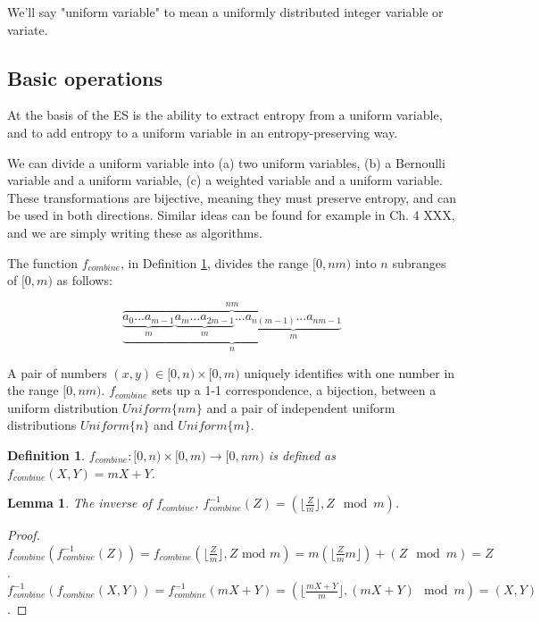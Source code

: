 \documentclass[12pt]{article}
\newtheorem{lemma}{Lemma}
\newtheorem{definition}{Definition}
\begin{document}
We'll say "uniform variable" to mean a uniformly distributed integer variable or variate.


\subsection{Basic operations}

At the basis of the ES is the ability to extract entropy from a uniform variable, and to add entropy to a uniform variable in an entropy-preserving way.

We can divide a uniform variable into (a) two uniform variables, (b) a Bernoulli variable and a uniform variable, (c) a weighted variable and a uniform variable. These transformations are bijective, meaning they must preserve entropy, and can be used in both directions. Similar ideas can be found for example in \cite{gentle2003random} Ch. 4 XXX, and we are simply writing these as algorithms.

The function $f_{combine}$, in Definition \ref{def:combine}, divides the range $[0,nm)$ into $n$ subranges of $[0,m)$ as follows:

\[
\overbrace{
    \underbrace{
        \underbrace{a_0 ... a_{m-1}}_{m}
        \underbrace{a_m ... a_{2m-1}}_{m}
        ...
        \underbrace{a_{n(m-1)}...a_{nm-1}}_{m} 
        }_{n}}
        ^{nm}
\]

A pair of numbers $(x,y) \in [0,n)\times[0,m)$ uniquely identifies with one number in the range $[0,nm)$. $f_{combine}$ sets up a 1-1 correspondence, a bijection, between a uniform distribution $Uniform\{nm\}$ and a pair of independent uniform distributions $Uniform\{n\}$ and $Uniform\{m\}$.

\begin{definition}
    $f_{combine}: [0,n)\times [0,m) \rightarrow [0,nm)$ is defined as $f_{combine}(X,Y) = mX+Y$.
    \label{def:combine}
\end{definition}

\begin{lemma}
    The inverse of $f_{combine}$, $f^{-1}_{combine}(Z) = (\lfloor \frac{Z}{m} \rfloor, Z \mod m)$.
\end{lemma}

\begin{proof}
    $f_{combine}(f^{-1}_{combine}(Z)) = f_{combine}(\lfloor \frac{Z}{m}\rfloor, Z \text{ mod } m) = m(\lfloor \frac{Z}{m}m \rfloor) + (Z \mod m) = Z$. $f^{-1}_{combine}(f_{combine}(X,Y)) = f^{-1}_{combine}(mX+Y) = (\lfloor\frac{mX+Y}{m}\rfloor, (mX+Y)\mod m) = (X,Y)$.
\end{proof}
\end{document}
